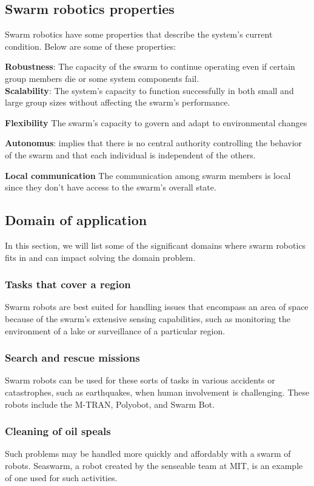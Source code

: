 \documentclass[12pt]{extarticle}
\begin{document}
\subsection{Swarm robotics properties}
Swarm robotics have some properties that describe the system's current condition. Below are some of these properties:

\textbf{Robustness}: The capacity of the swarm to continue operating even if certain group members die or some system components fail.\\ \textbf{Scalability}: The system's capacity to function successfully in both small and large group sizes without affecting the swarm's performance.

\textbf{Flexibility} The swarm's capacity to govern and adapt to environmental changes 

\textbf{Autonomus}: implies that there is no central authority controlling the behavior of the swarm and that each individual is independent of the others.

\textbf{Local communication} The communication among swarm members is local since they don't have access to the swarm's overall state. \cite{brambilla2013swarm}\cite{olaronke2020systematic}
  

\subsection{Domain of application}
In this section, we will list some of the significant domains where swarm robotics fits in and can impact solving the domain problem.\newpage
\subsubsection{Tasks that cover a region}
Swarm robots are best suited for handling issues that encompass an area of space because of the swarm's extensive sensing capabilities, such as monitoring the environment of a lake or surveillance of a particular region. \cite{csahin2005swarm}\cite{olaronke2020systematic}

\subsubsection{Search and rescue missions}
Swarm robots can be used for these sorts of tasks in various accidents or catastrophes, such as earthquakes, when human involvement is challenging. These robots include the M-TRAN, Polyobot, and Swarm Bot.

\subsubsection{Cleaning of oil speals}
Such problems may be handled more quickly and affordably with a swarm of robots. Seaswarm, a robot created by the senseable team at MIT, is an example of one used for such activities.
\end{document}
